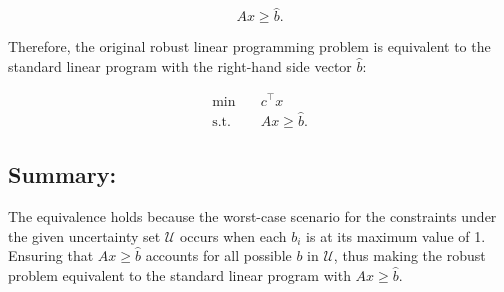 \documentclass{article}
\begin{document}
\begin{equation*}
Ax \geq \hat{b}.
\end{equation*}

Therefore, the original robust linear programming problem is equivalent to the standard linear program with the right-hand side vector $\hat{b}$:

\begin{align*}
\min \quad & c^\top x \\
\text{s.t.} \quad & Ax \geq \hat{b}.
\end{align*}

\subsection{Summary:}

The equivalence holds because the worst-case scenario for the constraints under the given uncertainty set $\mathcal{U}$ occurs when each $b_i$ is at its maximum value of 1. Ensuring that $Ax \geq \hat{b}$ accounts for all possible $b$ in $\mathcal{U}$, thus making the robust problem equivalent to the standard linear program with $Ax \geq \hat{b}$.
\end{document}
